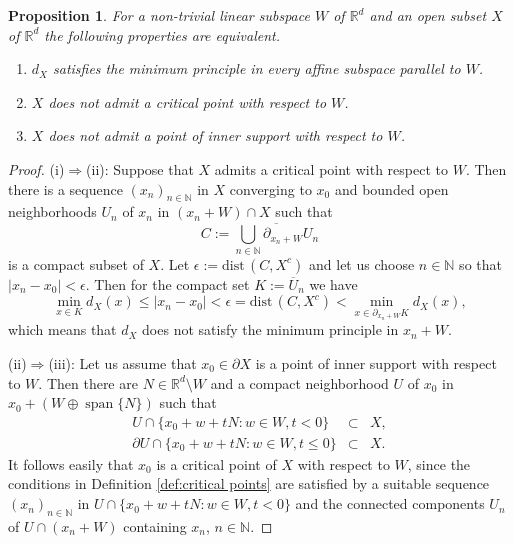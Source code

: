 \documentclass[a4paper,10pt]{amsart}
\newtheorem{proposition}[theorem]{Proposition}
\newtheorem*{crucial lemma}{Lemma \ref{lem:nice polynomial2}}
\theoremstyle{definition}
\newcommand{\R}{\mathbb{R}}
\newcommand{\N}{\mathbb{N}}
\newcommand{\dist}{\mbox{dist}\,}
\begin{document}
\begin{proposition}\label{prop:equivalence to minimum principle}
	For a non-trivial linear subspace $W$ of $\R^d$ and an open subset $X$ of $\R^d$ the following properties are equivalent.
	\begin{enumerate}[{\upshape(i)}]
		\item $d_X$ satisfies the minimum principle in every affine subspace parallel to $W$.
		\item $X$ does not admit a critical point with respect to $W$.
		\item $X$ does not admit a point of inner support with respect to $W$.
	\end{enumerate}
\end{proposition}
\begin{proof}
	(i)$\Rightarrow$(ii): Suppose that $X$ admits a critical point with respect to $W$.
	Then there is a sequence $(x_n)_{n\in\N}$ in $X$ converging to $x_0$ and bounded open neighborhoods $U_n$ of $x_n$ in $(x_n+W)\cap X$ such that 
	\[C:=\overline{\bigcup_{n\in\N}\partial_{x_n+W} U_n}\]
	is a compact subset of $X$. Let $\epsilon:=\dist(C,X^c)$ and let us choose $n\in\N$ so that $|x_n-x_0|<\epsilon$. Then for the compact set $K:=\overline U_n$ we have
	\[\min_{x\in K}d_X(x)\leq|x_n-x_0|<\epsilon=\dist(C,X^c)<\min_{x\in\partial_{x_n+W}K}d_X(x),\]
	which means that $d_X$ does not satisfy the minimum principle in $x_n+W$.
    
	(ii)$\Rightarrow$(iii): Let us assume that $x_0\in\partial X$ is a point of inner support with respect to $W$. Then there are $N\in\R^d\setminus W$ and a compact neighborhood $U$ of $x_0$ in $x_0+(W\oplus\operatorname{span}\{N\})$ such that
    \begin{eqnarray*}
        U\cap\{x_0+w+tN\colon w\in W, t<0\}&\subset& X,\\
		\partial U\cap\{x_0+w+tN\colon w\in W, t\leq 0\}&\subset& X.
    \end{eqnarray*}
	It follows easily that $x_0$ is a critical point of $X$ with respect to $W$, since the conditions in Definition \ref{def:critical points} are satisfied by a suitable sequence $(x_n)_{n\in\N}$ in $U\cap\{x_0+w+ tN\colon w\in W, t<0\}$ and the connected components $U_n$ of $U\cap (x_n+W)$ containing $x_n$, $n\in\N$.


\end{proof}
\end{document}

